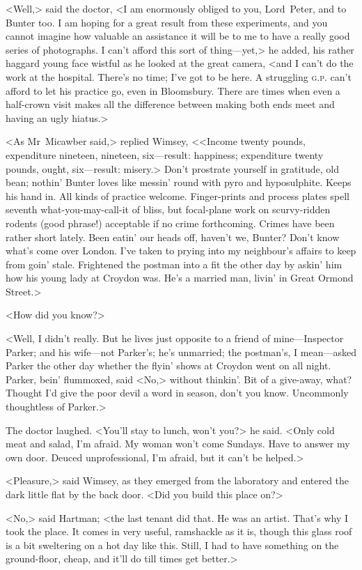 <Well,> said the doctor, <I am enormously obliged to you, Lord~Peter, and to Bunter too. I am hoping for a great result from these experiments, and you cannot imagine how valuable an assistance it will be to me to have a really good series of photographs. I can't afford this sort of thing—yet,> he added, his rather haggard young face wistful as he looked at the great camera, <and I can't do the work at the hospital. There's no time; I've got to be here. A struggling \textsc{g.p.} can't afford to let his practice go, even in Bloomsbury. There are times when even a half-crown visit makes all the difference between making both ends meet and having an ugly hiatus.>

<As Mr~Micawber said,> replied Wimsey, <<Income twenty pounds, expenditure nineteen, nineteen, six—result: happiness; expenditure twenty pounds, ought, six—result: misery.> Don't prostrate yourself in gratitude, old bean; nothin' Bunter loves like messin' round with pyro and hyposulphite. Keeps his hand in. All kinds of practice welcome. Finger-prints and process plates spell seventh what-you-may-call-it of bliss, but focal-plane work on scurvy-ridden rodents (good phrase!) acceptable if no crime forthcoming. Crimes have been rather short lately. Been eatin' our heads off, haven't we, Bunter? Don't know what's come over London. I've taken to prying into my neighbour's affairs to keep from goin' stale. Frightened the postman into a fit the other day by askin' him how his young lady at Croydon was. He's a married man, livin' in Great Ormond Street.>

<How did you know?>

<Well, I didn't really. But he lives just opposite to a friend of mine—Inspector Parker; and his wife—not Parker's; he's unmarried; the postman's, I mean—asked Parker the other day whether the flyin' shows at Croydon went on all night. Parker, bein' flummoxed, said <No,> without thinkin'. Bit of a give-away, what? Thought I'd give the poor devil a word in season, don't you know. Uncommonly thoughtless of Parker.>

The doctor laughed. <You'll stay to lunch, won't you?> he said. <Only cold meat and salad, I'm afraid. My woman won't come Sundays. Have to answer my own door. Deuced unprofessional, I'm afraid, but it can't be helped.>

<Pleasure,> said Wimsey, as they emerged from the laboratory and entered the dark little flat by the back door. <Did you build this place on?>

<No,> said Hartman; <the last tenant did that. He was an artist. That's why I took the place. It comes in very useful, ramshackle as it is, though this glass roof is a bit sweltering on a hot day like this. Still, I had to have something on the ground-floor, cheap, and it'll do till times get better.>

